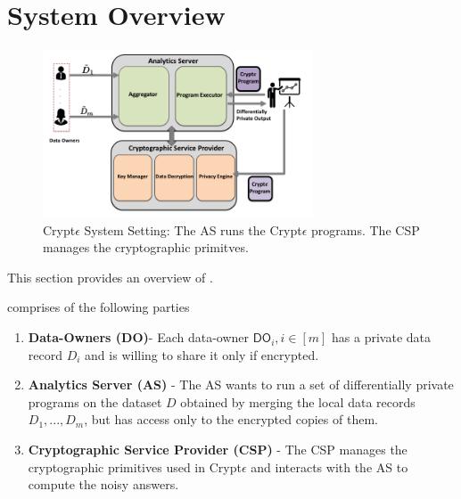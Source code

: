 \section{System Overview}

\begin{figure}\includegraphics[height=5cm,width=8cm]{cry.png} \caption{ Crypt$\epsilon$ System Setting: The  \textsf{AS} runs the Crypt$\epsilon$ programs. The \textsf{CSP} manages the cryptographic primitves. } \end{figure}



This section provides an overview of \system.

\system comprises of the following parties\begin{enumerate}
\item \textbf{Data-Owners (\textsf{DO})}-  Each data-owner $\textsf{DO}_i, i \in [m]$ has  a
private data record $D_i$ and is willing to share it only if encrypted.    \item \textbf{Analytics Server (\textsf{AS})} - The \textsf{AS} wants to run a set of differentially private programs on the dataset $D$ obtained by merging the local data records $D_1, ... , D_m$, but has
access only to the encrypted copies of them.
\item \textbf{Cryptographic Service Provider (\textsf{CSP})} -
 The \textsf{CSP} manages the cryptographic primitives used in Crypt$\epsilon$ and interacts with the \textsf{AS} to compute the
noisy answers.
\end{enumerate}

